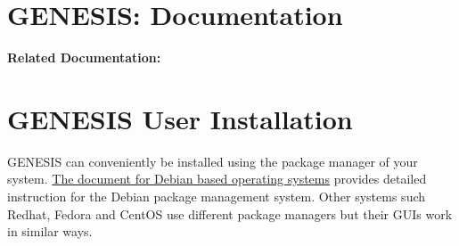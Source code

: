 \documentclass[12pt]{article}
\begin{document}
\section*{GENESIS: Documentation}

{\bf Related Documentation:}

\section*{GENESIS User Installation}

GENESIS can conveniently be installed using the package manager of
your system.
\href{../installation-debian/installation-debian.tex}{The document for
  Debian based operating systems} provides detailed instruction for
the Debian package management system.  Other systems such Redhat,
Fedora and CentOS use different package managers but their GUIs work
in similar ways.






\end{document}
